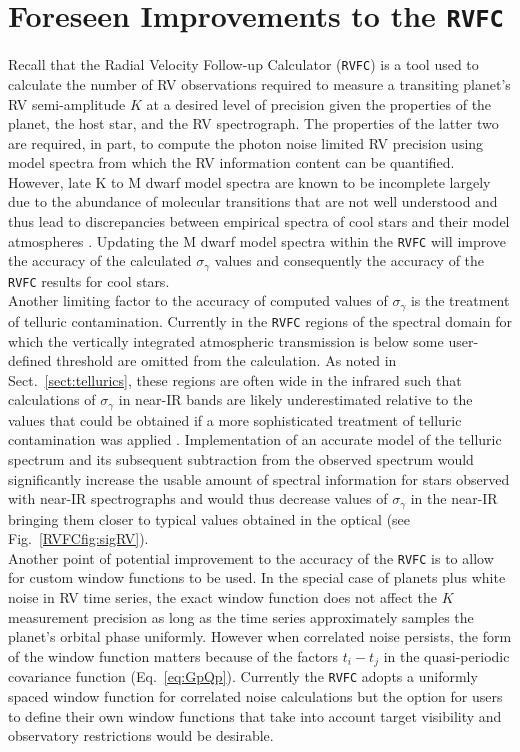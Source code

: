 \section{Foreseen Improvements to the \texttt{RVFC}}
Recall that the Radial Velocity Follow-up Calculator (\texttt{RVFC}) is a tool
used to calculate the number of RV observations required to measure a transiting
planet's RV semi-amplitude $K$ at a desired level of precision given the properties
of the planet, the host star, and the RV spectrograph. The properties of the latter two
are required, in part, to compute the photon noise limited RV precision using
model spectra from which the RV information content can be quantified. However,
late K to M dwarf model spectra are known to be incomplete largely due to the
abundance of molecular transitions that are not well understood and thus lead to
discrepancies between empirical spectra of cool stars and their model atmospheres
\citep{passegger16,behmard19}. Updating the M dwarf model spectra within the
\texttt{RVFC} will improve the accuracy of the calculated $\sigma_{\gamma}$ values
and consequently the accuracy of the \texttt{RVFC} results for cool stars. \\

Another limiting factor to the accuracy of computed values of $\sigma_{\gamma}$
is the treatment of telluric contamination. Currently in the \texttt{RVFC}
regions of the spectral domain for which the vertically integrated atmospheric
transmission is below some user-defined threshold are omitted from the
calculation. As noted in Sect.~\ref{sect:tellurics}, these regions are often
wide in the infrared such that calculations of $\sigma_{\gamma}$ in near-IR
bands are likely underestimated relative to the values that could be obtained
if a more sophisticated treatment of telluric contamination was applied
\citep[e.g.][]{artigau14,bedell19}. Implementation of an accurate model of the
telluric spectrum and its subsequent subtraction from the observed spectrum
would significantly increase the usable amount of spectral information for stars
observed with near-IR spectrographs and would thus decrease values of
$\sigma_{\gamma}$ in the near-IR bringing them closer to typical values obtained
in the optical (see Fig.~\ref{RVFCfig:sigRV}). \\

Another point of potential improvement to the accuracy of the \texttt{RVFC} is
to allow for custom window functions to be used. In the special case of planets
plus white noise in RV time series, the exact window function does not affect the
$K$ measurement precision \sigK{} as long as the time series approximately
samples the planet's orbital phase uniformly. However when correlated noise
persists, the form of the window function matters because of the factors
$t_i-t_j$ in the quasi-periodic covariance function (Eq.~\ref{eq:GpQp}).
Currently the \texttt{RVFC}
adopts a uniformly spaced window function for correlated noise calculations but
the option for users to define their own window functions that take into account
target visibility and observatory restrictions would be desirable.


